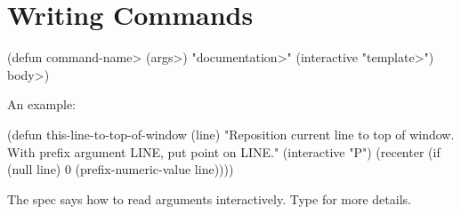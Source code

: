 \section{Writing Commands}

\beginexample%
(defun \<command-name> (\<args>)
  "\<documentation>" (interactive "\<template>")
  \<body>)
\endexample

An example:

\beginexample%
(defun this-line-to-top-of-window (line)
  "Reposition current line to top of window.
With prefix argument LINE, put point on LINE."
  (interactive "P")
  (recenter (if (null line)
                0
              (prefix-numeric-value line))))
\endexample

The  spec says how to read arguments interactively.
Type  for more details.

\copyrightnotice

\bye


